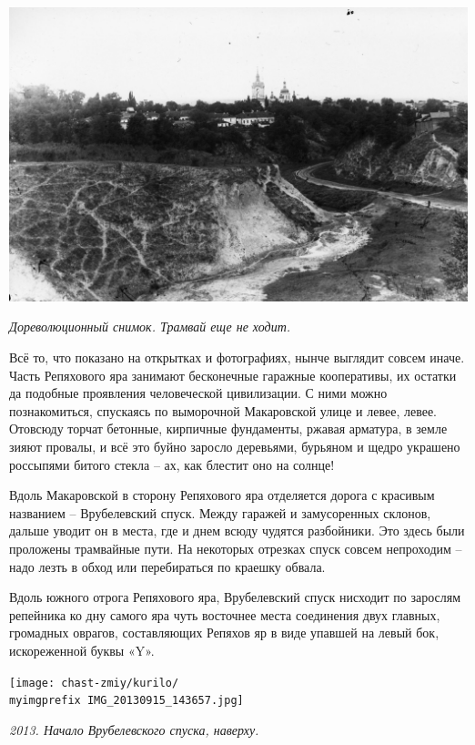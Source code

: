 
\begin{center}
\includegraphics[width=\linewidth]{chast-zmiy/kurilo/rep-14.jpg}

\textit{Дореволюционный снимок. Трамвай еще не ходит.}
\end{center}

Всё то, что показано на открытках и фотографиях, нынче выглядит совсем иначе. Часть Репяхового яра занимают бесконечные гаражные кооперативы, их остатки да подобные проявления человеческой цивилизации. С ними можно познакомиться, спускаясь по выморочной Макаровской улице и левее, левее. Отовсюду торчат бетонные, кирпичные фундаменты, ржавая арматура, в земле зияют провалы, и всё это буйно заросло деревьями, бурьяном и щедро украшено россыпями битого стекла – ах, как блестит оно на солнце!

Вдоль Макаровской в сторону Репяхового яра отделяется дорога с красивым названием – Врубелевский спуск. Между гаражей и замусоренных склонов, дальше уводит он в места, где и днем всюду чудятся разбойники. Это здесь были проложены трамвайные пути. На некоторых отрезках спуск совсем непроходим – надо лезть в обход или перебираться по краешку обвала.

Вдоль южного отрога Репяхового яра, Врубелевский спуск нисходит по зарослям репейника ко дну самого яра чуть восточнее места соединения двух главных, громадных оврагов, составляющих Репяхов яр в виде упавшей на левый бок, искореженной буквы «Y».

\begin{center}
\texttt{[image: chast-zmiy/kurilo/\\myimgprefix IMG\_20130915\_143657.jpg]}

\textit{2013. Начало Врубелевского спуска, наверху.}
\end{center}

